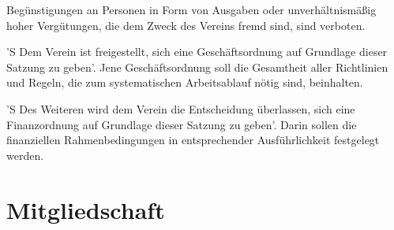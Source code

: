 \documentclass[%
    parskip=half,
]{scrartcl}
\begin{document}
\begin{contract}

Begünstigungen an Personen in Form von Ausgaben oder unverhältnismäßig hoher Vergütungen, die dem Zweck des Vereins fremd sind, sind verboten.


'S Dem Verein ist freigestellt, sich eine Geschäftsordnung auf Grundlage dieser Satzung zu geben'.
Jene Geschäftsordnung soll die Gesamtheit aller Richtlinien und Regeln, die zum systematischen Arbeitsablauf nötig sind, beinhalten.

'S Des Weiteren wird dem Verein die Entscheidung überlassen, sich eine Finanzordnung auf Grundlage dieser Satzung zu geben'.
Darin sollen die finanziellen Rahmenbedingungen in entsprechender Ausführlichkeit festgelegt werden.

\end{contract}

\section{Mitgliedschaft}
\end{document}
